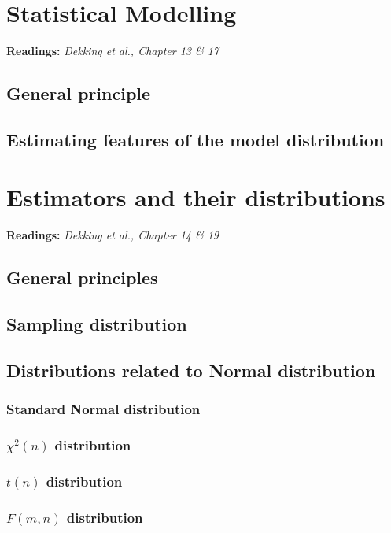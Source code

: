 \documentclass[a4paper]{article}
\begin{document}
\newpage
\section{Statistical Modelling}
\textbf{Readings:} \textit{Dekking et al., Chapter 13 \& 17}

\begin{mdframed}[style=Summary]
    
\end{mdframed}
\subsection{General principle}
\subsection{Estimating features of the model distribution}
\newpage
\section{Estimators and their distributions}
\textbf{Readings:} \textit{Dekking et al., Chapter 14 \& 19}

\begin{mdframed}[style=Summary]
    
\end{mdframed}
\subsection{General principles}
\subsection{Sampling distribution}
\subsection{Distributions related to Normal distribution}
\subsubsection*{Standard Normal distribution}
\subsubsection*{$\chi^2(n)$ distribution}
\subsubsection*{$t(n)$ distribution}
\subsubsection*{$F(m,n)$ distribution}
\newpage
\end{document}
